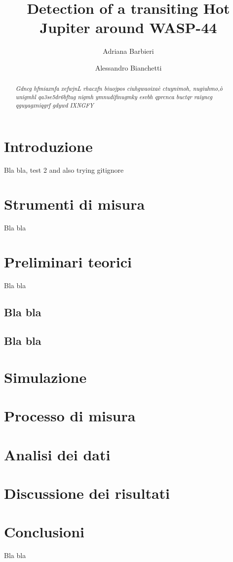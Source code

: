 \documentclass[a4paper,11pt,twocolumn]{article}
\title{Detection of a transiting Hot Jupiter around WASP-44}
\author{Adriana Barbieri \and Alessandro Bianchetti}
\begin{document}
\maketitle

\begin{abstract}

\emph{Gdncg hfmiaxnfa   xefwjnL rhacxfn  biuojpos  ciuhgwaoixaè ctuynimoh, nugiuhmo,ò  unigmhl qa3se5dr6bftug nigmh ymnudifinugmky esvbh qprcnca buctqr  raiyncg  qguyagxniqgrf gdywd IXNGFY}

\end{abstract}

\section{Introduzione}

Bla bla, test 2
and also trying gitignore


\section{Strumenti di misura}

Bla bla



\section{Preliminari teorici}

Bla bla




\subsection{Bla bla}



\subsection{Bla bla}



\section{Simulazione}



\section{Processo di misura}






\section{Analisi dei dati}





\section{Discussione dei risultati}



\section{Conclusioni}

Bla bla
\end{document}
